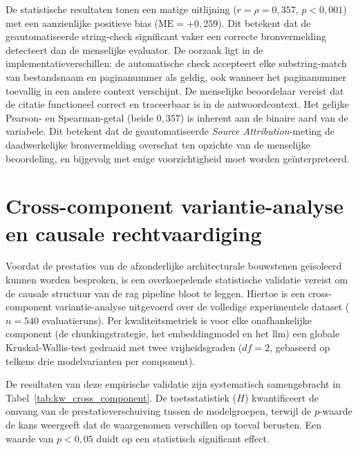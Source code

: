 De statistische resultaten tonen een matige uitlijning ($r = \rho = 0{,}357$, $p < 0{,}001$) met een aanzienlijke positieve bias ($\text{ME} = +0{,}259$). Dit betekent dat de geautomatiseerde string-check significant vaker een correcte bronvermelding detecteert dan de menselijke evaluator. De oorzaak ligt in de implementatieverschillen: de automatische check accepteert elke substring-match van bestandsnaam en paginanummer als geldig, ook wanneer het paginanummer toevallig in een andere context verschijnt. De menselijke beoordelaar vereist dat de citatie functioneel correct en traceerbaar is in de antwoordcontext. Het gelijke Pearson- en Spearman-getal (beide $0{,}357$) is inherent aan de binaire aard van de variabele. Dit betekent dat de geautomatiseerde \textit{Source Attribution}-meting de daadwerkelijke bronvermelding overschat ten opzichte van de menselijke beoordeling, en bijgevolg met enige voorzichtigheid moet worden geïnterpreteerd.

\section{Cross-component variantie-analyse en causale rechtvaardiging}
\label{sec:cross-component-analyse}

Voordat de prestaties van de afzonderlijke architecturale bouwstenen geïsoleerd kunnen worden besproken, is een overkoepelende statistische validatie vereist om de causale structuur van de \gls{rag} pipeline bloot te leggen. Hiertoe is een cross-component variantie-analyse uitgevoerd over de volledige experimentele dataset ($n = 540$ evaluatieruns). Per kwaliteitsmetriek is voor elke onafhankelijke component (de chunkingstrategie, het embeddingmodel en het \gls{llm}) een globale Kruskal-Wallis-test gedraaid met twee vrijheidsgraden ($df = 2$, gebaseerd op telkens drie modelvarianten per component).

De resultaten van deze empirische validatie zijn systematisch samengebracht in Tabel~\ref{tab:kw_cross_component}. De toetsstatistiek ($H$) kwantificeert de omvang van de prestatieverschuiving tussen de modelgroepen, terwijl de $p$-waarde de kans weergeeft dat de waargenomen verschillen op toeval berusten. Een waarde van $p < 0{,}05$ duidt op een statistisch significant effect.

